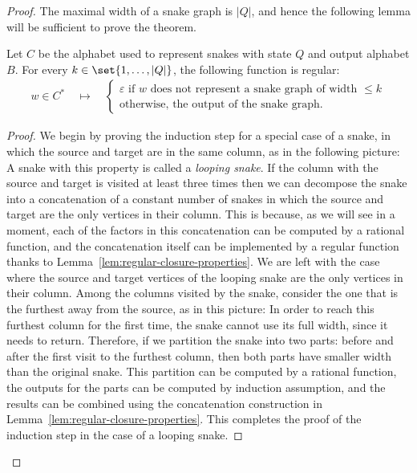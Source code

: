 \begin{proof}
The maximal width of a snake graph is $|Q|$, and hence the following lemma will be sufficient to prove the theorem. 
\begin{lemma}\label{lem:output-of-snake-graph-is-regular}
    Let $C$ be the alphabet used to represent snakes with state $Q$ and output alphabet $B$. For every $k \in \set{1,\ldots,|Q|}$, the following function is regular:
    \begin{align*}
    w \in C^* \quad \mapsto \quad 
    \begin{cases}
        \text{$\varepsilon$ if $w$ does not represent a snake graph of width $\le k$}\\
        \text{otherwise, the output of the snake graph.}
    \end{cases}
    \end{align*}
\end{lemma}
\begin{proof}
We begin by proving the induction step for a special case of a snake, in which the source and target are in the same column, as in the following picture:
    A snake with this property is called a \emph{looping snake}. 
    If the column with the source and target is visited at least three times then we can decompose the snake into a concatenation of a constant number of snakes in which the source and target are the only vertices in their column. This is because, as we will see in a moment, each of the factors in this concatenation can be computed by a rational function, and the concatenation itself  can be implemented by a regular function thanks to Lemma~\ref{lem:regular-closure-properties}.
    We are left with the case where the source and target vertices of the looping snake are the only vertices in their column. Among the columns visited by the snake, consider the one that is the furthest away from the source, as in this picture:
    In order to reach this furthest column for the first time, the snake cannot use its full width, since it needs to return. Therefore, if we partition the snake into two parts: before and after the first visit to the furthest column, then both parts have smaller width than the original snake. This partition can be computed by a rational function, the outputs for the parts can be computed by induction assumption, and the results can be combined using the concatenation construction in Lemma~\ref{lem:regular-closure-properties}. This completes the proof of the induction step in the case of a looping snake. 
    


\end{proof}
\end{proof}
